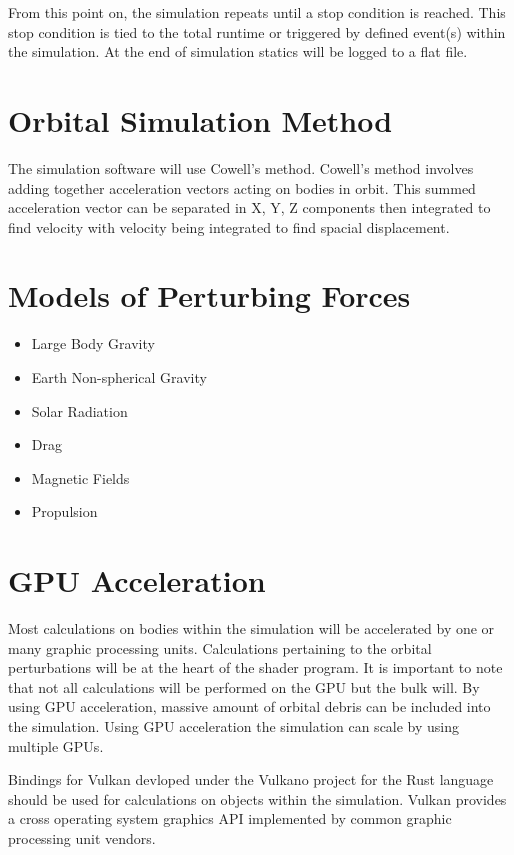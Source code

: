 \documentclass{article}
\begin{document}
  From this point on, the simulation repeats until a stop condition is reached. This stop condition is tied to the total runtime or triggered by defined event(s) within the simulation. At the end of simulation statics will be logged to a flat file.
  
  \section{Orbital Simulation Method}
  
  The simulation software will use Cowell’s method. Cowell’s method involves adding together acceleration vectors acting on bodies in orbit. This summed acceleration vector can be separated in X, Y, Z components then integrated to find velocity with velocity being integrated to find spacial displacement. 
  
  \section{Models of Perturbing Forces}
  
  \begin{itemize}
  	\item Large Body Gravity
  	\item Earth Non-spherical Gravity
  	\item Solar Radiation
  	\item Drag
  	\item Magnetic Fields
  	\item Propulsion
  \end{itemize}
  
  
  \section{GPU Acceleration}
  
Most calculations on bodies within the simulation will be accelerated by one or many graphic processing units. Calculations pertaining to the orbital perturbations will be at the heart of the shader program. It is important to note that not all calculations will be performed on the GPU but the bulk will. By using GPU acceleration, massive amount of orbital debris can be included into the simulation. Using GPU acceleration the simulation can scale by using multiple GPUs.

\bigskip
\noindent
Bindings for Vulkan devloped under the Vulkano project for the Rust language should be used for calculations on objects within the simulation. Vulkan provides a cross operating system graphics API implemented by common graphic processing unit vendors.
  
\end{document}
